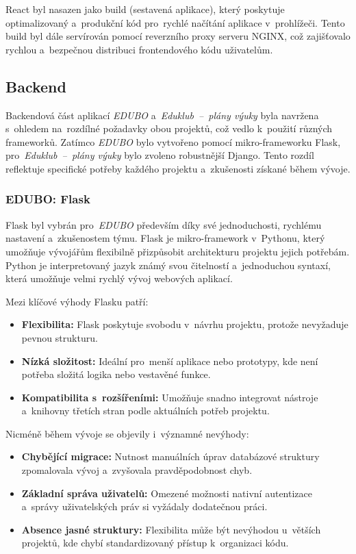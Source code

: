 \documentclass[male,czech,api_bc]{kitheses}
\begin{document}
React byl nasazen jako build (sestavená aplikace), který poskytuje optimalizovaný a~produkční kód pro~rychlé načítání aplikace v~prohlížeči. Tento build byl dále servírován pomocí reverzního proxy serveru NGINX, což zajišťovalo rychlou a~bezpečnou distribuci frontendového kódu uživatelům.

\subsection{Backend}

Backendová část aplikací \textit{EDUBO} a~\textit{Eduklub~--~plány výuky} byla navržena s~ohledem na~rozdílné požadavky obou projektů, což vedlo k~použití různých frameworků. Zatímco \textit{EDUBO} bylo vytvořeno pomocí mikro-frameworku Flask, pro~\textit{Eduklub~--~plány výuky} bylo zvoleno robustnější Django. Tento rozdíl reflektuje specifické potřeby každého projektu a~zkušenosti získané během vývoje.

\subsubsection{EDUBO: Flask}

Flask byl vybrán pro~\textit{EDUBO} především díky své jednoduchosti, rychlému nastavení a~zkušenostem týmu. Flask je mikro-framework v~Pythonu, který umožňuje vývojářům flexibilně přizpůsobit architekturu projektu jejich potřebám. Python je interpretovaný jazyk známý svou čitelností a~jednoduchou syntaxí, která umožňuje velmi rychlý vývoj webových aplikací.\cite{python}

Mezi klíčové výhody Flasku patří:
\begin{itemize}
	\item \textbf{Flexibilita:} Flask poskytuje svobodu v~návrhu projektu, protože nevyžaduje pevnou strukturu.
	\item \textbf{Nízká složitost:} Ideální pro~menší aplikace nebo prototypy, kde není potřeba složitá logika nebo vestavěné funkce.
	\item \textbf{Kompatibilita s~rozšířeními:} Umožňuje snadno integrovat nástroje a~knihovny třetích stran podle aktuálních potřeb projektu.
\end{itemize}

Nicméně během vývoje se objevily i~významné nevýhody:
\begin{itemize}
	\item \textbf{Chybějící migrace:} Nutnost manuálních úprav databázové struktury zpomalovala vývoj a~zvyšovala pravděpodobnost chyb.
	\item \textbf{Základní správa uživatelů:} Omezené možnosti nativní autentizace a~správy uživatelských práv si vyžádaly dodatečnou práci.\cite[s.~164]{flask}
	\item \textbf{Absence jasné struktury:} Flexibilita může být nevýhodou u~větších projektů, kde chybí standardizovaný přístup k~organizaci kódu.
\end{itemize}
\end{document}
